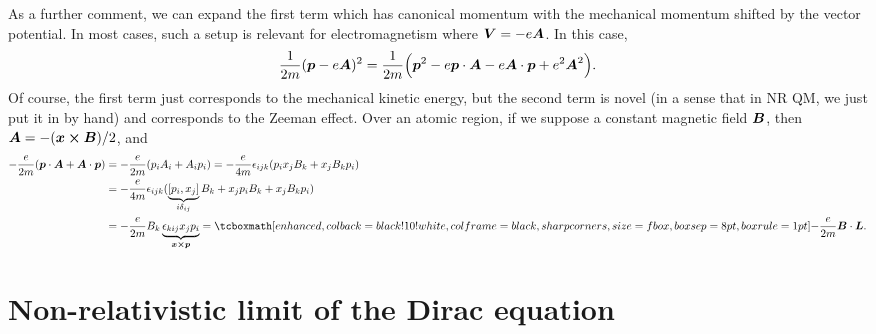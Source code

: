 As a further comment, we can expand the first term which has canonical momentum with the mechanical momentum shifted by the vector potential.
In most cases, such a setup is relevant for electromagnetism where $\vb*{V} = -e \vb*{A}$.
In this case,
\begin{align}
    \frac{1}{2m} (\vb*{p} - e \vb*{A})^2 = \frac{1}{2m} \Big( \vb*{p}^2 - e \vb*{p} \cdot \vb*{A} - e \vb*{A} \cdot \vb*{p} + e^2 \vb*{A}^2 \Big)
.\end{align}
Of course, the first term just corresponds to the mechanical kinetic energy, but the second term is novel (in a sense that in NR QM, we just put it in by hand) and corresponds to the Zeeman effect.
Over an atomic region, if we suppose a constant magnetic field $\vb*{B}$, then $\vb*{A} = -(\vb*{x} \cross \vb*{B})/2$, and
\begin{align}
    -\frac{e}{2m} ( \vb*{p} \cdot \vb*{A} + \vb*{A} \cdot \vb*{p} ) &= -\frac{e}{2m} ( p_{i} A_{i} + A_{i} p_{i} ) = -\frac{e}{4m} \epsilon_{ijk} ( p_{i} x_{j} B_{k} + x_{j} B_{k} p_{i} ) \nonumber \\
                                                                    &= -\frac{e}{4m} \epsilon_{ijk} ( \underbrace{ [p_{i},x_{j}] }_{i \delta_{ij}} B_{k} + x_{j} p_{i} B_{k} + x_{j} B_{k} p_{i} ) \nonumber \\
                                                                    &= -\frac{e}{2m} B_{k} \underbrace{ \epsilon_{kij} x_{j} p_{i} }_{\vb*{x} \cross \vb*{p}} = \eqbox{ -\frac{e}{2m} \vb*{B} \cdot \vb*{L} }
.\end{align}


\section{Non-relativistic limit of the Dirac equation}
\label{sec:nr-limit-of-the-kg-equation}

